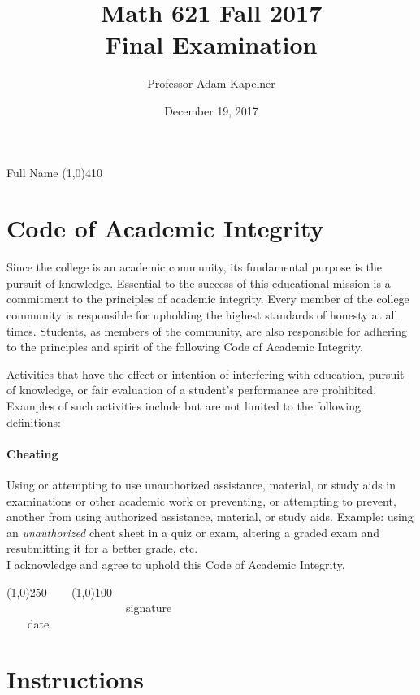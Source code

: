 \documentclass[12pt]{article}
\title{Math 621 Fall 2017 \\ Final Examination}
\author{Professor Adam Kapelner}
\date{December 19, 2017}
\begin{document}
\maketitle

\noindent Full Name \line(1,0){410}%

\thispagestyle{empty}

\section*{Code of Academic Integrity}

\footnotesize
Since the college is an academic community, its fundamental purpose is the pursuit of knowledge. Essential to the success of this educational mission is a commitment to the principles of academic integrity. Every member of the college community is responsible for upholding the highest standards of honesty at all times. Students, as members of the community, are also responsible for adhering to the principles and spirit of the following Code of Academic Integrity.

Activities that have the effect or intention of interfering with education, pursuit of knowledge, or fair evaluation of a student's performance are prohibited. Examples of such activities include but are not limited to the following definitions:

\paragraph{Cheating} Using or attempting to use unauthorized assistance, material, or study aids in examinations or other academic work or preventing, or attempting to prevent, another from using authorized assistance, material, or study aids. Example: using an \emph{unauthorized} cheat sheet in a quiz or exam, altering a graded exam and resubmitting it for a better grade, etc.
\\

\noindent I acknowledge and agree to uphold this Code of Academic Integrity. \\

\begin{center}
\line(1,0){250} ~~~ \line(1,0){100}\\
~~~~~~~~~~~~~~~~~~~~~signature~~~~~~~~~~~~~~~~~~~~~~~~~~~~~~~~~~~~~~~~~~~~~ date
\end{center}

\normalsize

\section*{Instructions}
\end{document}
